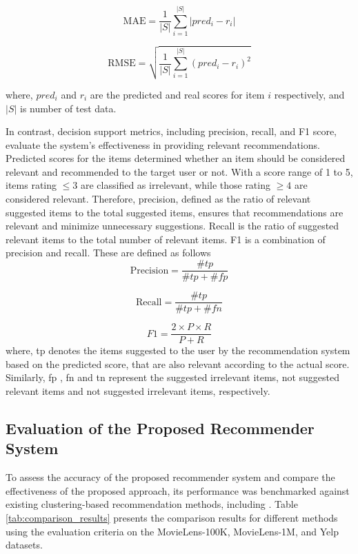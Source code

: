 \documentclass{article}
\theoremstyle{plain}
\theoremstyle{definition}
\theoremstyle{remark}
\begin{document}
\begin{equation}
    \text{MAE} = \frac{1}{|S|} \sum_{i=1}^{|S|} |pred_i - r_i|
\end{equation}


\begin{equation}
    \text{RMSE} = \sqrt{\frac{1}{|S|} \sum_{i=1}^{|S|} (pred_i - r_i)^2}
\end{equation}

where, $pred_i$ and $r_i$ are the predicted and real scores for item $i$ respectively, and $|S|$ is number of test data.

In contrast, decision support metrics, including precision, recall, and F1 score, evaluate the system's effectiveness in providing relevant recommendations. Predicted scores for the items determined whether an item should be considered relevant and recommended to the target user or not. With a score range of 1 to 5, items rating $\leq 3$ are classified as irrelevant, while those rating $\geq 4$ are considered relevant. Therefore, precision, defined as the ratio of relevant suggested items to the total suggested items, ensures that recommendations are relevant and minimize unnecessary suggestions. Recall is the ratio of suggested relevant items to the total number of relevant items. F1 is a combination of precision and recall. These are defined as follows
\[
\text{Precision} = \frac{\#tp}{\#tp + \#fp}
\]

\[
\text{Recall} = \frac{\#tp}{\#tp + \#fn}
\]

\[
F1 = \frac{2 \times P \times R}{P + R}
\]
where, tp denotes the items suggested to the user by the recommendation system based on the predicted score, that are also relevant according to the actual score. Similarly, fp , fn and tn represent the suggested irrelevant items, not suggested relevant items and not suggested irrelevant items, respectively.


\subsection{Evaluation of the Proposed Recommender System}
To assess the accuracy of the proposed recommender system and compare the effectiveness of the proposed approach, its performance was benchmarked against existing clustering-based recommendation methods, including \cite{liji2018improved, kant2017leaderrank, mohammadpour2019efficient, wasid2018clustering}. Table \ref{tab:comparison_results} presents the comparison results for different methods using the evaluation criteria on the MovieLens-100K, MovieLens-1M, and Yelp datasets.
\end{document}
